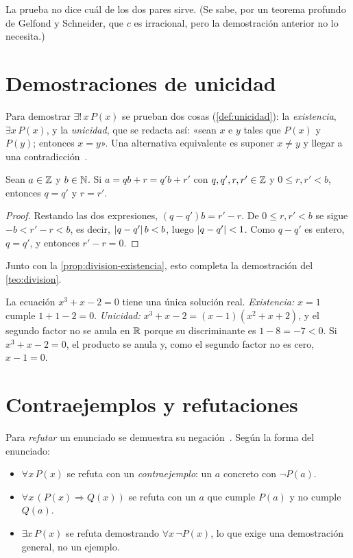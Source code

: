 La prueba no dice cuál de los dos pares sirve. (Se sabe, por un teorema profundo de Gelfond y Schneider, que $c$ es irracional, pero la demostración anterior no lo necesita.)

\section{Demostraciones de unicidad}

Para demostrar $\exists!\,x\,P(x)$ se prueban dos cosas (\cref{def:unicidad}): la \emph{existencia}, $\exists x\,P(x)$, y la \emph{unicidad}, que se redacta así: «sean $x$ e $y$ tales que $P(x)$ y $P(y)$; entonces $x=y$». Una alternativa equivalente es suponer $x\neq y$ y llegar a una contradicción~\cite[§3.6]{velleman}.

\begin{proposicion}\label{prop:division-unicidad}
Sean $a\in\mathbb{Z}$ y $b\in\mathbb{N}$. Si $a=qb+r=q'b+r'$ con $q,q',r,r'\in\mathbb{Z}$ y $0\le r,r'<b$, entonces $q=q'$ y $r=r'$.
\end{proposicion}

\begin{proof}
Restando las dos expresiones, $(q-q')b=r'-r$. De $0\le r,r'<b$ se sigue $-b<r'-r<b$, es decir, $\lvert q-q'\rvert\,b<b$, luego $\lvert q-q'\rvert<1$. Como $q-q'$ es entero, $q=q'$, y entonces $r'-r=0$.
\end{proof}

Junto con la \cref{prop:division-existencia}, esto completa la demostración del \cref{teo:division}.

\begin{ejemplo}\label{ej:unico-real}
La ecuación $x^{3}+x-2=0$ tiene una única solución real. \emph{Existencia:} $x=1$ cumple $1+1-2=0$. \emph{Unicidad:} $x^{3}+x-2=(x-1)(x^{2}+x+2)$, y el segundo factor no se anula en $\mathbb{R}$ porque su discriminante es $1-8=-7<0$. Si $x^{3}+x-2=0$, el producto se anula y, como el segundo factor no es cero, $x-1=0$.
\end{ejemplo}

\section{Contraejemplos y refutaciones}

Para \emph{refutar} un enunciado se demuestra su negación~\cite[cap.~9]{hammack}. Según la forma del enunciado:
\begin{itemize}[leftmargin=1.4em]
  \item $\forall x\,P(x)$ se refuta con un \emph{contraejemplo}: un $a$ concreto con $\neg P(a)$.
  \item $\forall x\,(P(x)\Rightarrow Q(x))$ se refuta con un $a$ que cumple $P(a)$ y no cumple $Q(a)$.
  \item $\exists x\,P(x)$ se refuta demostrando $\forall x\,\neg P(x)$, lo que exige una demostración general, no un ejemplo.
\end{itemize}

